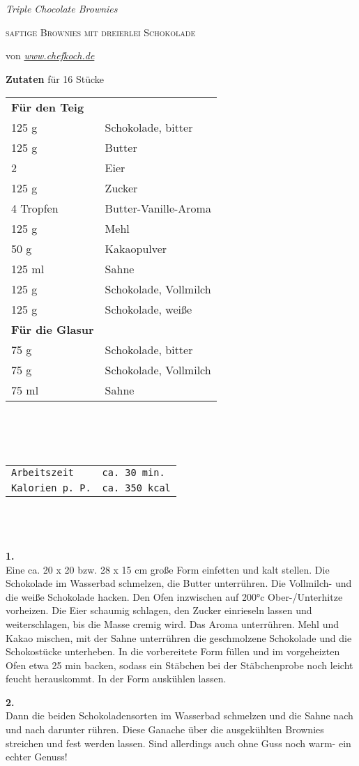 \documentclass[german,a4paper]{article}
\begin{document}
\noindent \begin{center}
\textsl{\huge{}Triple Chocolate Brownies}{\huge\par}
\par\end{center}

\noindent \begin{center}
\textsc{saftige Brownies mit dreierlei Schokolade}
\par\end{center}

\noindent \begin{center}
{\small{}von }\textit{\textcolor{blue}{\small{}\url{www.chefkoch.de}}}{\small\par}
\par\end{center}

\noindent \textbf{Zutaten }für 16 Stücke\textbf{}\\

\noindent %
\begin{tabular}{ll}
\textbf{Für den Teig} & \tabularnewline
125 g & Schokolade, bitter\tabularnewline
125 g & Butter\tabularnewline
2 & Eier\tabularnewline
125 g & Zucker\tabularnewline
4 Tropfen & Butter-Vanille-Aroma\tabularnewline
125 g & Mehl\tabularnewline
50 g & Kakaopulver\tabularnewline
125 ml & Sahne\tabularnewline
125 g & Schokolade, Vollmilch\tabularnewline
125 g & Schokolade, weiße\tabularnewline
\textbf{Für die Glasur} & \tabularnewline
75 g & Schokolade, bitter\tabularnewline
75 g & Schokolade, Vollmilch\tabularnewline
75 ml & Sahne\tabularnewline
\end{tabular}\\
\\
\\
\begin{tabular}{ll}
\texttt{\footnotesize{}Arbeitszeit} & \texttt{\footnotesize{}ca. 30 min.}\tabularnewline
\texttt{\footnotesize{}Kalorien p. P.} & \texttt{\footnotesize{}ca. 350 kcal}\tabularnewline
\end{tabular}\\
\\
\\
\textbf{1.}\\
Eine ca. 20 x 20 bzw. 28 x 15 cm große Form einfetten und kalt stellen.
Die Schokolade im Wasserbad schmelzen, die Butter unterrühren. Die
Vollmilch- und die weiße Schokolade hacken. Den Ofen inzwischen auf
200°c Ober-/Unterhitze vorheizen. Die Eier schaumig schlagen, den
Zucker einrieseln lassen und weiterschlagen, bis die Masse cremig
wird. Das Aroma unterrühren. Mehl und Kakao mischen, mit der Sahne
unterrühren die geschmolzene Schokolade und die Schokostücke unterheben.
In die vorbereitete Form füllen und im vorgeheizten Ofen etwa 25 min
backen, sodass ein Stäbchen bei der Stäbchenprobe noch leicht feucht
herauskommt. In der Form auskühlen lassen. 

\noindent \textbf{2.}\\
Dann die beiden Schokoladensorten im Wasserbad schmelzen und die Sahne
nach und nach darunter rühren. Diese Ganache über die ausgekühlten
Brownies streichen und fest werden lassen. Sind allerdings auch ohne
Guss \textendash noch warm- ein echter Genuss!
\end{document}
